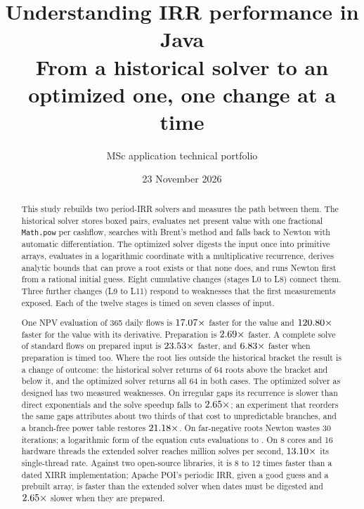 \documentclass[a4paper,11pt]{article}
\title{Understanding IRR performance in Java\protect\\From a historical solver to an optimized one, one change at a time}
\author{MSc application technical portfolio}
\date{23 November 2026}
\newcommand{\code}[1]{\texttt{#1}}
\begin{document}
\maketitle
\begin{abstract}
This study rebuilds two period-IRR solvers and measures the path between them. The historical solver stores boxed pairs, evaluates net present value with one fractional \code{Math.pow} per cashflow, searches with Brent's method and falls back to Newton with automatic differentiation. The optimized solver digests the input once into primitive arrays, evaluates in a logarithmic coordinate with a multiplicative recurrence, derives analytic bounds that can prove a root exists or that none does, and runs Newton first from a rational initial guess. Eight cumulative changes (stages L0 to L8) connect them. Three further changes (L9 to L11) respond to weaknesses that the first measurements exposed. Each of the twelve stages is timed on seven classes of input.

One NPV evaluation of 365 daily flows is $17.07\times$ faster for the value and $120.80\times$ faster for the value with its derivative. Preparation is $2.69\times$ faster. A complete solve of standard flows on prepared input is $23.53\times$ faster, and $6.83\times$ faster when preparation is timed too. Where the root lies outside the historical bracket the result is a change of outcome: the historical solver returns \RootsHistoricalExtremePositive{} of 64 roots above the bracket and \RootsHistoricalExtremeNegative{} below it, and the optimized solver returns all 64 in both cases. The optimized solver as designed has two measured weaknesses. On irregular gaps its recurrence is slower than direct exponentials and the solve speedup falls to $2.65\times$; an experiment that reorders the same gaps attributes about two thirds of that cost to unpredictable branches, and a branch-free power table restores $21.18\times$. On far-negative roots Newton wastes 30 iterations; a logarithmic form of the equation cuts \MeanEvaluationsExtremeNegativeOptimized{} evaluations to \MeanEvaluationsExtremeNegativeExtended. On 8 cores and 16 hardware threads the extended solver reaches \ThroughputExtendedStandardMax{} million solves per second, $13.10\times$ its single-thread rate. Against two open-source libraries, it is 8 to 12 times faster than a dated XIRR implementation; Apache POI's periodic IRR, given a good guess and a prebuilt array, is faster than the extended solver when dates must be digested and $2.65\times$ slower when they are prepared.
\end{abstract}
\end{document}
